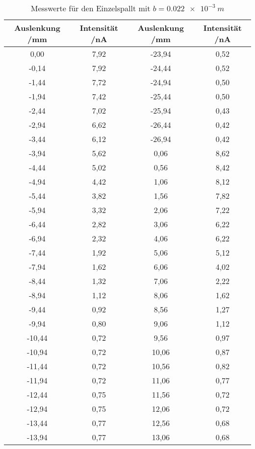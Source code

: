 \begin{table}[h!]
  \centering
  \caption{Messwerte für den Einzelspallt mit $b=\SI{0,022e-3}{m}$}
  \label{tab:1a}
  \begin{tabular}{c c c c}
    \toprule
       Auslenkung /mm  & Intensität /nA & Auslenkung /mm& Intensität /nA  \\
    \midrule

	  0,00	  	& 7,92 & -23,94	  	& 0,52\\
	 -0,14	  	& 7,92 & -24,44	    &	0,52\\
	 -1,44	  	& 7,72 & -24,94	    &	0,50\\
	 -1,94	  	& 7,42 & -25,44	    &	0,50\\
	 -2,44	  	& 7,02 & -25,94	  	& 0,43\\
	 -2,94	  	& 6,62 & -26,44	  	& 0,42\\
	 -3,44	  	& 6,12 & -26,94	  	& 0,42\\
	 -3,94	  	& 5,62 & 0,06	    	& 8,62\\
	 -4,44	  	& 5,02 & 0,56	    	& 8,42\\
	 -4,94	  	& 4,42 & 1,06	    	& 8,12\\
	 -5,44	  	& 3,82 & 1,56	    	& 7,82\\
	 -5,94	  	& 3,32 & 2,06	    	& 7,22\\
	 -6,44	  	& 2,82 & 3,06	    	& 6,22\\
	 -6,94	  	& 2,32 & 4,06	    	& 6,22\\
	 -7,44	  	& 1,92 & 5,06	    	& 5,12\\
	 -7,94	  	& 1,62 & 6,06	    	& 4,02\\
	 -8,44	  	& 1,32 & 7,06	    	& 2,22\\
	 -8,94	  	& 1,12 & 8,06	    	& 1,62\\
	 -9,44	  	& 0,92 & 8,56	    	& 1,27\\
	 -9,94	  	& 0,80 & 9,06	    	& 1,12\\
	 -10,44	  	& 0,72 & 9,56	    	& 0,97\\
	 -10,94	  	& 0,72 & 10,06    	& 0,87\\
	 -11,44	  	& 0,72 & 10,56	  	& 0,82\\
	 -11,94	  	& 0,72 & 11,06	  	& 0,77\\
	 -12,44	  	& 0,75 & 11,56	  	& 0,72\\
	 -12,94	  	& 0,75 & 12,06	  	& 0,72\\
	 -13,44	  	& 0,77 & 12,56	  	& 0,68\\
	 -13,94	  	& 0,77 & 13,06	  	& 0,68\\

\end{tabular}
\end{table}
